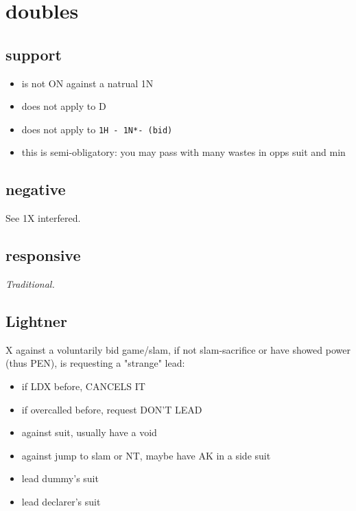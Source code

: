 \section{doubles}

\subsection{support}

\begin{itemize}
    \setlength\itemsep{0pt}
    \item is not ON against a natrual 1N
    \item does not apply to D
    \item does not apply to \texttt{1H - 1N*- (bid)}
    \item this is semi-obligatory: you may pass with many wastes in opps suit and min
\end{itemize}

\subsection{negative}

See {\color{blue} 1X interfered}.

\subsection{responsive}

\textit{Traditional.}

\subsection{Lightner}

X against a voluntarily bid game/slam, if not slam-sacrifice or have showed power (thus PEN), is requesting a "strange" lead:

\begin{itemize}
    \setlength\itemsep{0pt}
    \item if LDX before, CANCELS IT
    \item if overcalled before, request DON'T LEAD
    \item against suit, usually have a void
    \item against jump to slam or NT, maybe have AK in a side suit
    \item lead dummy's suit
    \item lead declarer's suit
\end{itemize}

